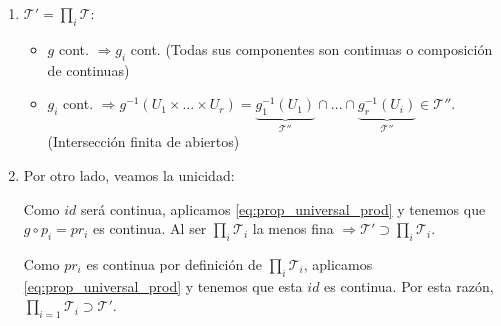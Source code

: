 \begin{demo}
\begin{enumerate}
    \item $\mathcal{T}' = \prod_{i} \mathcal{T}: $ 
    \begin{itemize}
        \item $g$ cont. $\Rightarrow g_i$ cont. (Todas sus componentes son continuas o composición de continuas)
        \item $g_i$ cont. $\Rightarrow g^{-1}\left( U_1 \times \ldots \times U_r \right) = \underbrace{g_1^{-1}\left( U_1 \right)}_{\mathcal{T}''} \cap \ldots \cap \underbrace{g_r^{-1}\left( U_i \right)}_{\mathcal{T}''} \in \mathcal{T}''$. (Intersección finita de abiertos) 
    \end{itemize}

    \item Por otro lado, veamos la unicidad:

    \begin{figure}[H]
        \centering    
    \end{figure}
    Como $id$ será continua, aplicamos \ref{eq:prop_universal_prod} y tenemos que $g \circ p_i = pr_i$ es continua. Al ser $\prod_{i} \mathcal{T}_i $ la menos fina $\Rightarrow \mathcal{T}' \supset \prod_{i} \mathcal{T}_i$.

    \begin{figure}[H]
        \centering    
    \end{figure}
    Como $pr_i$ es continua por definición de $\prod_{i} \mathcal{T}_i$, aplicamos \ref{eq:prop_universal_prod} y tenemos que esta $id$ es continua. Por esta razón, $\prod_{i=1} \mathcal{T}_i \supset \mathcal{T}'$.
\end{enumerate}
\end{demo}

